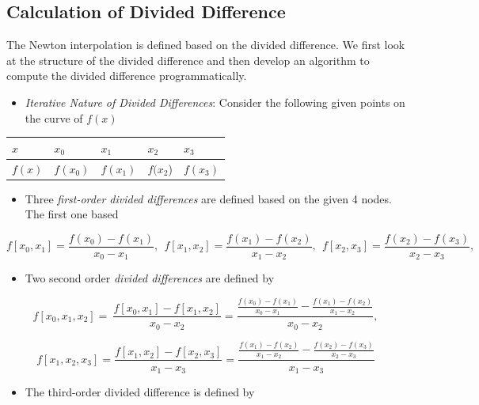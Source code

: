 \documentclass[
]{book}
\providecommand{\tightlist}{%
  \setlength{\itemsep}{0pt}\setlength{\parskip}{0pt}}
\begin{document}
\hypertarget{calculation-of-divided-difference}{%
\subsection{Calculation of Divided Difference}\label{calculation-of-divided-difference}}

The Newton interpolation is defined based on the divided difference. We first look at the structure of the divided difference and then develop an algorithm to compute the divided difference programmatically.

\begin{itemize}
\tightlist
\item
  \emph{Iterative Nature of Divided Differences}: Consider the following given points on the curve of \(f(x)\)
\end{itemize}

\begin{longtable}[]{@{}lllll@{}}
\toprule\noalign{}
\(x\) & \(x_0\) & \(x_1\) & \(x_2\) & \(x_3\) \\
\midrule\noalign{}
\endhead
\bottomrule\noalign{}
\endlastfoot
\(f(x)\) & \(f(x_0)\) & \(f(x_1)\) & \(f(x_2\)) & \(f(x_3)\) \\
\end{longtable}

\begin{itemize}
\tightlist
\item
  Three \emph{first-order divided differences} are defined based on the given 4 nodes. The first one based
\end{itemize}

\[
f[x_0, x_1] = \frac{f(x_0) - f(x_1)}{x_0 - x_1}, \ \ f[x_1, x_2] = \frac{f(x_1) - f(x_2)}{x_1 - x_2}, \ \ f[x_2, x_3] = \frac{f(x_2) - f(x_3)}{x_2 - x_3},
\]

\begin{itemize}
\tightlist
\item
  Two second order \emph{divided differences} are defined by
\end{itemize}

\[
f[x_0, x_1, x_2] = \ \frac{f[x_0, x_1] - f[x_1, x_2]}{x_0-x_2} =\frac{\frac{f(x_0) - f(x_1)}{x_0 - x_1}-\frac{f(x_1) - f(x_2)}{x_1 - x_2}}{x_0 - x_2}, 
\]

\[
f[x_1, x_2, x_3] = \frac{f[x_1, x_2] - f[x_2, x_3]}{x_1-x_3} = \frac{\frac{f(x_1) - f(x_2)}{x_1 - x_2}-\frac{f(x_2) - f(x_3)}{x_2 - x_3}}{x_1 - x_3}
\]

\begin{itemize}
\tightlist
\item
  The third-order divided difference is defined by
\end{itemize}
\end{document}
